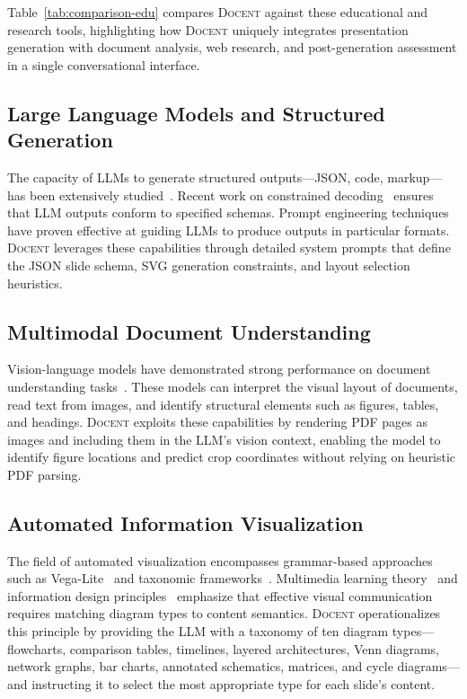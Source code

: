 \documentclass[11pt,a4paper]{article}
\newcommand{\system}{\textsc{Docent}\xspace}
\begin{document}
Table~\ref{tab:comparison-edu} compares \system against these educational and research tools, highlighting how \system uniquely integrates presentation generation with document analysis, web research, and post-generation assessment in a single conversational interface.

\subsection{Large Language Models and Structured Generation}

The capacity of LLMs to generate structured outputs---JSON, code, markup---has been extensively studied~\citep{brown2020language, chen2021evaluating, wei2022chain}.
Recent work on constrained decoding~\citep{willard2023guided} ensures that LLM outputs conform to specified schemas.
Prompt engineering techniques~\citep{reynolds2021prompt} have proven effective at guiding LLMs to produce outputs in particular formats.
\system leverages these capabilities through detailed system prompts that define the JSON slide schema, SVG generation constraints, and layout selection heuristics.

\subsection{Multimodal Document Understanding}

Vision-language models have demonstrated strong performance on document understanding tasks~\citep{liu2023visual, wang2024docllm, li2024multimodal}.
These models can interpret the visual layout of documents, read text from images, and identify structural elements such as figures, tables, and headings.
\system exploits these capabilities by rendering PDF pages as images and including them in the LLM's vision context, enabling the model to identify figure locations and predict crop coordinates without relying on heuristic PDF parsing.

\subsection{Automated Information Visualization}

The field of automated visualization encompasses grammar-based approaches such as Vega-Lite~\citep{satyanarayan2017vegalite} and taxonomic frameworks~\citep{shneiderman1996eyes, heer2010tour}.
Multimedia learning theory~\citep{mayer2009multimedia} and information design principles~\citep{tufte2001visual} emphasize that effective visual communication requires matching diagram types to content semantics.
\system operationalizes this principle by providing the LLM with a taxonomy of ten diagram types---flowcharts, comparison tables, timelines, layered architectures, Venn diagrams, network graphs, bar charts, annotated schematics, matrices, and cycle diagrams---and instructing it to select the most appropriate type for each slide's content.
\end{document}

